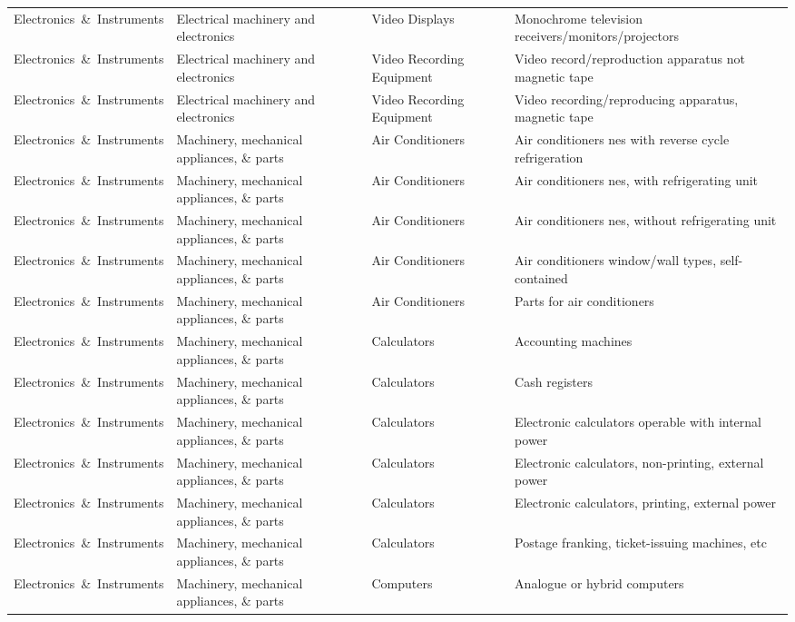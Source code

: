 \begin{appendices}
\begin{xltabular}{\textwidth}{|p{0.14\textwidth}|p{0.28\textwidth}|p{0.18\textwidth}|p{0.30\textwidth}|}
Electronics\ \&\ Instruments & Electrical machinery and electronics & Video Displays & Monochrome television receivers/monitors/projectors \\
Electronics\ \&\ Instruments & Electrical machinery and electronics & Video Recording Equipment & Video record/reproduction apparatus not magnetic tape \\
Electronics\ \&\ Instruments & Electrical machinery and electronics & Video Recording Equipment & Video recording/reproducing apparatus, magnetic tape \\
Electronics\ \&\ Instruments & Machinery, mechanical appliances, \& parts & Air Conditioners & Air conditioners nes with reverse cycle refrigeration \\
Electronics\ \&\ Instruments & Machinery, mechanical appliances, \& parts & Air Conditioners & Air conditioners nes, with refrigerating unit \\
Electronics\ \&\ Instruments & Machinery, mechanical appliances, \& parts & Air Conditioners & Air conditioners nes, without refrigerating unit \\
Electronics\ \&\ Instruments & Machinery, mechanical appliances, \& parts & Air Conditioners & Air conditioners window/wall types, self-contained \\
Electronics\ \&\ Instruments & Machinery, mechanical appliances, \& parts & Air Conditioners & Parts for air conditioners \\
Electronics\ \&\ Instruments & Machinery, mechanical appliances, \& parts & Calculators & Accounting machines \\
Electronics\ \&\ Instruments & Machinery, mechanical appliances, \& parts & Calculators & Cash registers \\
Electronics\ \&\ Instruments & Machinery, mechanical appliances, \& parts & Calculators & Electronic calculators operable with internal power \\
Electronics\ \&\ Instruments & Machinery, mechanical appliances, \& parts & Calculators & Electronic calculators, non-printing, external power \\
Electronics\ \&\ Instruments & Machinery, mechanical appliances, \& parts & Calculators & Electronic calculators, printing, external power \\
Electronics\ \&\ Instruments & Machinery, mechanical appliances, \& parts & Calculators & Postage franking, ticket-issuing machines, etc \\
Electronics\ \&\ Instruments & Machinery, mechanical appliances, \& parts & Computers & Analogue or hybrid computers \\

\end{xltabular}
\end{appendices}
